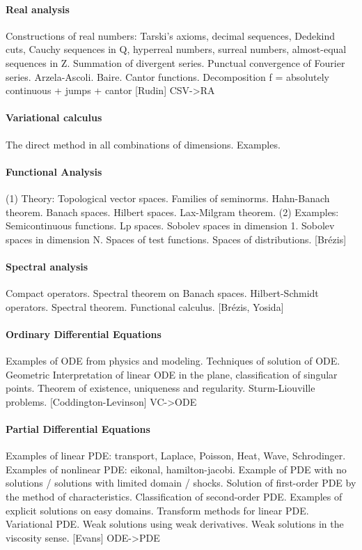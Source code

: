 \paragraph{Real analysis}
Constructions of real numbers: Tarski's axioms, decimal sequences, Dedekind
cuts, Cauchy sequences in Q, hyperreal numbers, surreal numbers, almost-equal
sequences in Z.
Summation of divergent series.
Punctual convergence of Fourier series.
Arzela-Ascoli.  Baire.  Cantor functions.
Decomposition f = absolutely continuous + jumps + cantor
[Rudin]
{CSV->RA}

\paragraph{Variational calculus}
The direct method in all combinations of dimensions.
Examples.



\paragraph{Functional Analysis}
(1) Theory:
Topological vector spaces.  Families of seminorms.  Hahn-Banach theorem.
Banach spaces.
Hilbert spaces.  Lax-Milgram theorem.
(2) Examples:
Semicontinuous functions.
Lp spaces.
Sobolev spaces in dimension 1.
Sobolev spaces in dimension N.
Spaces of test functions.
Spaces of distributions.
[Brézis]

\paragraph{Spectral analysis}
Compact operators.
Spectral theorem on Banach spaces.
Hilbert-Schmidt operators.
Spectral theorem.  Functional calculus.
[Brézis, Yosida]

\paragraph{Ordinary Differential Equations}
Examples of ODE from physics and modeling.
Techniques of solution of ODE.
Geometric Interpretation of linear ODE in the plane, classification of
singular points.
Theorem of existence, uniqueness and regularity.
Sturm-Liouville problems.
[Coddington-Levinson]
{VC->ODE}

\paragraph{Partial Differential Equations}
Examples of linear PDE: transport, Laplace, Poisson, Heat, Wave, Schrodinger.
Examples of nonlinear PDE: eikonal, hamilton-jacobi.
Example of PDE with no solutions / solutions with limited domain / shocks.
Solution of first-order PDE by the method of characteristics.
Classification of second-order PDE.  Examples of explicit solutions on easy
domains.
Transform methods for linear PDE.
Variational PDE.
Weak solutions using weak derivatives.
Weak solutions in the viscosity sense.
[Evans]
{ODE->PDE}

